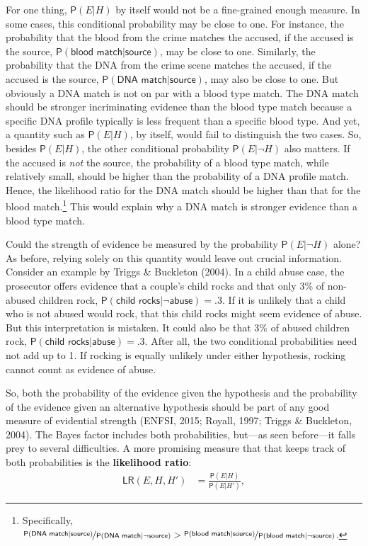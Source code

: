 \documentclass[
  10pt,
  dvipsnames,enabledeprecatedfontcommands]{scrartcl}
\newcommand{\pr}[1]{\mathsf{P}(#1)}
\begin{document}
For one thing, \(\pr{E \vert H}\) by itself would not be a fine-grained
enough measure. In some cases, this conditional probability may be close
to one. For instance, the probability that the blood from the crime
matches the accused, if the accused is the source,
\(\pr{\textsf{blood match} \vert \textsf{source}}\), may be close to
one. Similarly, the probability that the DNA from the crime scene
matches the accused, if the accused is the source,
\(\pr{\textsf{DNA match} \vert \textsf{source}}\), may also be close to
one. But obviously a DNA match is not on par with a blood type match.
The DNA match should be stronger incriminating evidence than the blood
type match because a specific DNA profile typically is less frequent
than a specific blood type. And yet, a quantity such as
\(\pr{E \vert H}\), by itself, would fail to distinguish the two cases.
So, besides \(\pr{E \vert H}\), the other conditional probability
\(\pr{E \vert \neg H}\) also matters. If the accused is \textit{not} the
source, the probability of a blood type match, while relatively small,
should be higher than the probability of a DNA profile match. Hence, the
likelihood ratio for the DNA match should be higher than that for the
blood match.\footnote{Specifically,
  \(\nicefrac{\pr{\textsf{DNA match} \vert \textsf{source}}}{\pr{\textsf{DNA match} \vert \neg \textsf{source}}} > \nicefrac{\pr{\textsf{blood match} \vert \textsf{source}}}{\pr{\textsf{blood match} \vert \neg \textsf{source}}}\).}
This would explain why a DNA match is stronger evidence than a blood
type match.

Could the strength of evidence be measured by the probability
\(\pr{E \vert \neg H}\) alone? As before, relying solely on this
quantity would leave out crucial information. Consider an example by
Triggs \& Buckleton (2004). In a child abuse case, the prosecutor offers
\label{text:rock} evidence that a couple's child rocks and that only 3\%
of non-abused children rock,
\(\pr{\textsf{child rocks} \vert \neg \textsf{abuse}}=.3\). If it is
unlikely that a child who is not abused would rock, that this child
rocks might seem evidence of abuse. But this interpretation is mistaken.
It could also be that 3\% of abused children rock,
\(\pr{\textsf{child rocks} \vert \textsf{abuse}}=.3\). After all, the
two conditional probabilities need not add up to 1. If rocking is
equally unlikely under either hypothesis, rocking cannot count as
evidence of abuse.

So, both the probability of the evidence given the hypothesis and the
probability of the evidence given an alternative hypothesis should be
part of any good measure of evidential strength (ENFSI, 2015; Royall,
1997; Triggs \& Buckleton, 2004). The Bayes factor includes both
probabilities, but---as seen before---it falls prey to several
difficulties. A more promising measure that that keeps track of both
probabilities is the \textbf{likelihood ratio}: \begin{align}
\label{eq:LR}
\tag{LR}
\mathsf{LR}(E,H,H') & = \frac{\pr{E \vert H}}{\pr{E \vert H'}},
\end{align}
\end{document}
